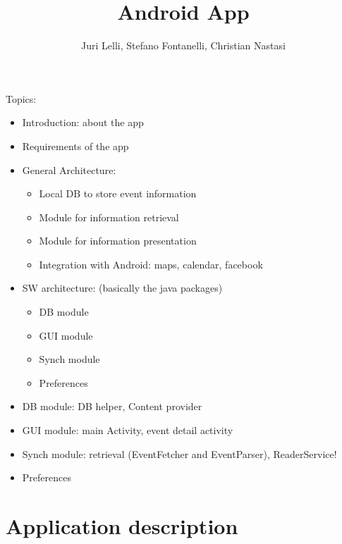 \documentclass[10pt, twoside]{article}
\title{\app Android App}
\author{Juri Lelli, Stefano Fontanelli, Christian Nastasi}
\begin{document}
\maketitle

Topics:
\begin{itemize} 
    \item Introduction: about the app
    \item Requirements of the app
    \item General Architecture:
    \begin{itemize} 
        \item Local DB to store event information
        \item Module for information retrieval
        \item Module for information presentation
        \item Integration with Android: maps, calendar, facebook
    \end{itemize} 
    \item SW architecture: (basically the java packages) 
    \begin{itemize} 
        \item DB module
        \item GUI module
        \item Synch module 
        \item Preferences 
    \end{itemize} 
    \item DB module: DB helper, Content provider
    \item GUI module: main Activity, event detail activity
    \item Synch module: retrieval (EventFetcher and EventParser), ReaderService!
    \item Preferences
\end{itemize} 
\normalsize


\section{Application description}
\end{document}

